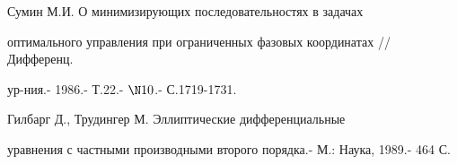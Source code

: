  


\vskip 2cm 


 






 


\label{end} 


 


 





 Сумин М.И. О минимизирующих последовательностях в задачах


оптимального управления при ограниченных фазовых координатах // Дифференц.


ур-ния.- 1986.- Т.22.- $\N 10$.- С.1719-1731.





 Гилбарг Д., Трудингер М. Эллиптические дифференциальные


уравнения с частными производными второго порядка.- М.: Наука, 1989.- 464 С.






